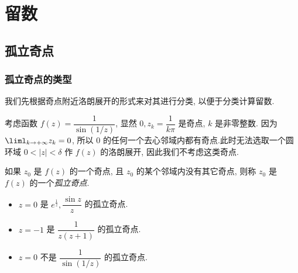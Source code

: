 
\chapter{留数}
\section{孤立奇点}

\subsection{孤立奇点的类型}

我们先根据奇点附近洛朗展开的形式来对其进行分类, 以便于分类计算留数.

\begin{example}
		考虑函数 $f(z)=\dfrac1{\sin(1/z)}$, 显然 $0,z_k=\dfrac1{k\pi}$ 是奇点, $k$ 是非零整数.
	{因为 $\liml_{k\to+\infty} z_k=0$, 所以 $0$ 的任何一个去心邻域内都有奇点.此时无法选取一个圆环域 $0<|z|<\delta$ 作 $f(z)$ 的洛朗展开, 因此我们不考虑这类奇点.
	}
	{
	\begin{center}
	\end{center}}
\end{example}

\begin{definition}
	如果 $z_0$ 是 $f(z)$ 的一个奇点, 且 $z_0$ 的某个邻域内没有其它奇点, 则称 $z_0$ 是 $f(z)$ 的一个\emph{孤立奇点}.
\end{definition}

\begin{example}
	\begin{itemize}
		\item $z=0$ 是 $e^{\frac1z},\dfrac{\sin z}z$ 的孤立奇点.
		\item $z=-1$ 是 $\dfrac1{z(z+1)}$ 的孤立奇点.
		\item $z=0$ 不是 $\dfrac1{\sin(1/z)}$ 的孤立奇点.
	\end{itemize}
\end{example}

